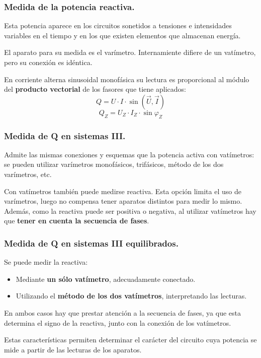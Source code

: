 		\subsubsection{Medida de la potencia reactiva.}
			Esta potencia aparece en los circuitos sonetidos a tensiones e intensidades variables en el tiempo y en los que existen elementos que almacenan energía.
			
			
			El aparato para su medida es el varímetro. Internamiente difiere de un vatímetro, pero su conexión es idéntica.
			
			
			En corriente alterna sinusoidal monofásica su lectura es proporcional al módulo del \textbf{producto vectorial} de los fasores que tiene aplicados:
			\[Q = U\cdot I \cdot \sin (\vec U, \vec I)\]
			\[Q_Z = U_Z\cdot I_Z \cdot \sin \varphi_Z\]
		
		\subsubsection{Medida de Q en sistemas III.}
			Admite las mismas conexiones y esquemas que la potencia activa con vatímetros: se pueden utilizar varímetros monofásicos, trifásicos, método de los dos varímetros, etc.
			
			
			Con vatímetros también puede medirse reactiva. Esta opción limita el uso de varímetros, luego no compensa tener aparatos distintos para medir lo mismo. Además, como la reactiva puede ser positiva o negativa, al utilizar vatímetros hay que \textbf{tener en cuenta la secuencia de fases}.
		
		\subsubsection{Medida de Q en sistemas III equilibrados.}
				Se puede medir la reactiva:
				\begin{itemize}
					\item Mediante \textbf{un sólo vatímetro}, adecuadamente conectado.
					\item Utilizando el \textbf{método de los dos vatímetros}, interpretando las lecturas.
				\end{itemize}
				
				
				En ambos casos hay que prestar atención a la secuencia de fases, ya que esta determina el signo de la reactiva, junto con la conexión de los vatímetros.
				
				
				Estas características permiten determinar el carácter del circuito cuya potencia se mide a partir de las lecturas de los aparatos.
			
